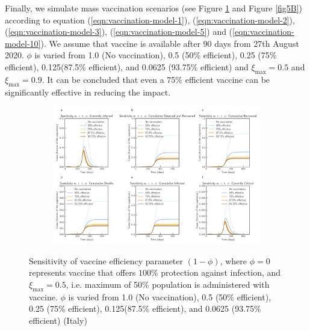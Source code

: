 \documentclass[fleqn,10pt]{wlscirep}
\begin{document}
Finally, we simulate mass vaccination scenarios (see Figure \ref{fig5A} and Figure \ref{fig5B}) according to equation (\ref{eqn:vaccination-model-1}), (\ref{eqn:vaccination-model-2}), (\ref{eqn:vaccination-model-3}), (\ref{eqn:vaccination-model-5}) and (\ref{eqn:vaccination-model-10}). We assume that vaccine is available after 90 days from 27th August 2020. $\phi$ is varied from 1.0 (No vaccination), 0.5 (50\% efficient), 0.25 (75\% efficient), 0.125(87.5\% efficient), and 0.0625 (93.75\% efficient) and $\xi_{\max} = 0.5$ and $\xi_{\max} = 0.9$. It can be concluded that even a 75\% efficient vaccine can be significantly effective in reducing the impact.

\begin{figure}[t!]
	\centering
	\begin{subfigure}[b]{\textwidth}
		\centering
		\includegraphics[width=1\linewidth]{Italy_scenario_vaccination0.5.pdf}
	\end{subfigure}
	\caption{Sensitivity of vaccine efficiency parameter $(1-\phi)$, where $\phi = 0$ represents vaccine that offers $100\%$ protection against infection, and $\xi_{\max} = 0.5$, i.e. maximum of 50\% population is administered with vaccine. $\phi$ is varied from 1.0 (No vaccination), 0.5 (50\% efficient), 0.25 (75\% efficient), 0.125(87.5\% efficient), and 0.0625 (93.75\% efficient) (Italy)}
	\label{fig5A} 
\end{figure}
\end{document}
